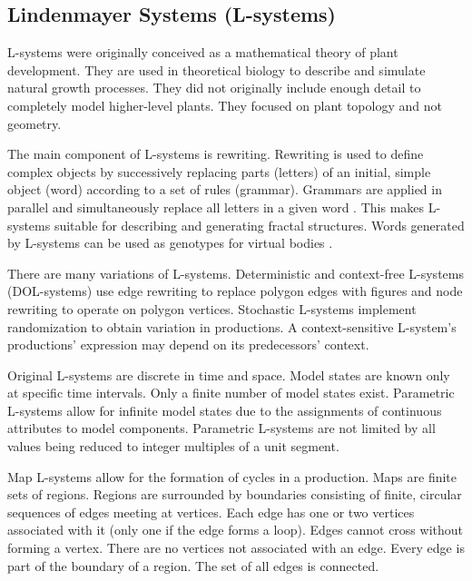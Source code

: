 \subsection{Lindenmayer Systems (L-systems)}

L-systems were originally conceived as a mathematical theory of plant development. They are used in theoretical biology to describe and simulate natural growth processes. They did not originally include enough detail to completely model higher-level plants. They focused on plant topology and not geometry. \citep{Kolodziej2002,Prusinkiewicz2004}

The main component of L-systems is rewriting. Rewriting is used to define complex objects by successively replacing parts (letters) of an initial, simple object (word) according to a set of rules (grammar). Grammars are applied in parallel and simultaneously replace all letters in a given word \citep{Prusinkiewicz2004}. This makes L-systems suitable for describing and generating fractal structures. Words generated by L-systems can be used as genotypes for virtual bodies \citep{Kolodziej2002}.

There are many variations of L-systems. Deterministic and context-free L-systems (DOL-systems) use edge rewriting to replace polygon edges with figures and node rewriting to operate on polygon vertices. Stochastic L-systems implement randomization to obtain variation in productions. A context-sensitive L-system's productions' expression may depend on its predecessors' context.  \citep{Prusinkiewicz2004}

Original L-systems are discrete in time and space. Model states are known only at specific time intervals. Only a finite number of model states exist. Parametric L-systems allow for infinite model states due to the assignments of continuous attributes to model components. Parametric L-systems are not limited by all values being reduced to integer multiples of a unit segment. \citep{Prusinkiewicz2004}

Map L-systems allow for the formation of cycles in a production. Maps are finite sets of regions. Regions are surrounded by boundaries consisting of finite, circular sequences of edges meeting at vertices. Each edge has one or two vertices associated with it (only one if the edge forms a loop). Edges cannot cross without forming a vertex. There are no vertices not associated with an edge. Every edge is part of the boundary of a region. The set of all edges is connected. \citep{Prusinkiewicz2004}

